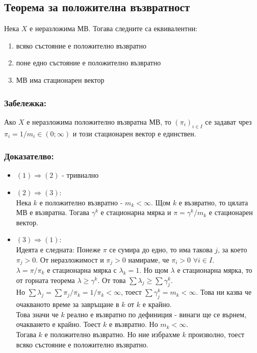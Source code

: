 \documentclass{article}
\begin{document}
\subsection{Теорема за положителна възвратност}
Нека $X$ е неразложима МВ. Тогава следните са еквивалентни:
\begin{enumerate}
\item всяко състояние е положително възвратно
\item поне едно състояние е положително възвратно
\item МВ има стационарен вектор
\end{enumerate}

\subsubsection*{Забележка:}
Ако $X$ е неразложима положително възвратна МВ, то $(\pi_i)_{i \in I}$ се задават чрез $\pi_i = 1/m_i \in (0; \infty)$ и този стационарен вектор е единствен.

\subsubsection*{Доказателво:}
\begin{itemize}
\item $(1) \Rightarrow (2)$ - тривиално
\item $(2) \Rightarrow (3)$: \\
Нека $k$ е положително възвратно - $m_k < \infty$. Щом $k$ е възвратно, то цялата МВ е възвратна. Тогава $\gamma^k$ е стационарна мярка и $\pi = \gamma^k/m_k$ е стационарен вектор.
\item $(3) \Rightarrow (1)$: \\
Идеята е следната: Понеже $\pi$ се сумира до едно, то има такова $j$, за което $\pi_j > 0$. От неразложимост и $\pi_j > 0$ намираме, че $\pi_i > 0$ $\forall i \in I$. \\
$\lambda = \pi/\pi_k$ е стационарна мярка с $\lambda_k = 1$. Но щом $\lambda$ е стационарна мярка, то от горната теорема $\lambda \geq \gamma^k$. От това $\sum \lambda_j \geq \sum \gamma_j^k$. \\
Но $\sum \lambda_j = \sum \pi_j/\pi_k = 1/\pi_k < \infty$, тоест $\sum \gamma_j^k = m_k < \infty$. Това ни казва че очакваното време за завръщане в $k$ от $k$ е крайно. \\
Това значи че $k$ реално е възвратно по дефиниция - винаги ще се върнем, очакването е крайно. Тоест $k$ е възвратно. Но $m_k < \infty$. \\
Тогава $k$ е положително възвратно. Но ние избрахме $k$ произволно, тоест всяко състояние е положително възвратно.
\end{itemize}
\end{document}

